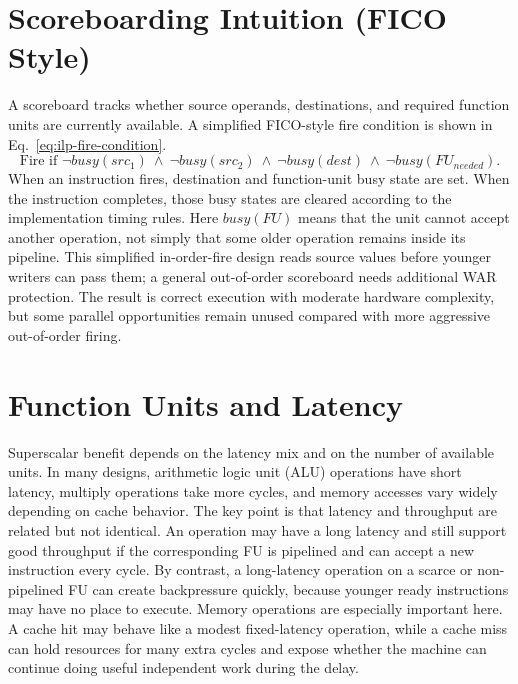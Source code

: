 \section{Scoreboarding Intuition (FICO Style)}\label{sec:ilp-scoreboard}
A scoreboard tracks whether source operands, destinations, and required function units are currently available.
A simplified FICO-style fire condition is shown in Eq.~\eqref{eq:ilp-fire-condition}.
\begin{equation}\label{eq:ilp-fire-condition}
    \text{Fire if }\neg busy(src_1)\ \wedge\ \neg busy(src_2)\ \wedge\ \neg busy(dest)\ \wedge\ \neg busy(FU_{needed}).
\end{equation}
When an instruction fires, destination and function-unit busy state are set.
When the instruction completes, those busy states are cleared according to the implementation timing rules.
Here $busy(FU)$ means that the unit cannot accept another operation, not simply that some older operation remains inside its pipeline.
This simplified in-order-fire design reads source values before younger writers can pass them; a general out-of-order scoreboard needs additional WAR protection.
The result is correct execution with moderate hardware complexity, but some parallel opportunities remain unused compared with more aggressive out-of-order firing.


\section{Function Units and Latency}\label{sec:ilp-latency}
Superscalar benefit depends on the latency mix and on the number of available units.
In many designs, arithmetic logic unit (ALU) operations have short latency, multiply operations take more cycles, and memory accesses vary widely depending on cache behavior.
The key point is that latency and throughput are related but not identical.
An operation may have a long latency and still support good throughput if the corresponding FU is pipelined and can accept a new instruction every cycle.
By contrast, a long-latency operation on a scarce or non-pipelined FU can create backpressure quickly, because younger ready instructions may have no place to execute.
Memory operations are especially important here.
A cache hit may behave like a modest fixed-latency operation, while a cache miss can hold resources for many extra cycles and expose whether the machine can continue doing useful independent work during the delay.

